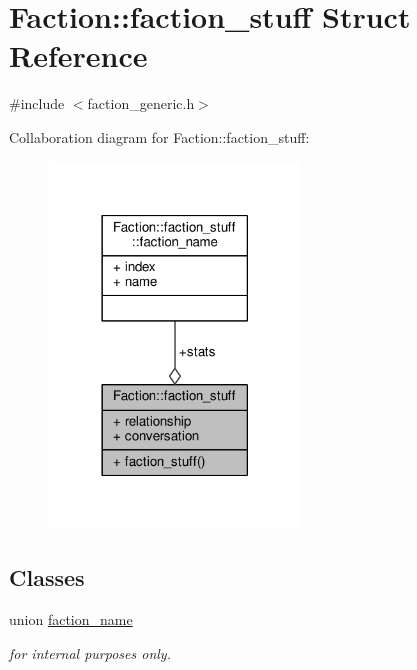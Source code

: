 \hypertarget{structFaction_1_1faction__stuff}{}\section{Faction\+:\+:faction\+\_\+stuff Struct Reference}
\label{structFaction_1_1faction__stuff}


{\ttfamily \#include $<$faction\+\_\+generic.\+h$>$}



Collaboration diagram for Faction\+:\+:faction\+\_\+stuff\+:
\nopagebreak
\begin{figure}[H]
\begin{center}
\leavevmode
\includegraphics[width=189pt]{dc/d6e/structFaction_1_1faction__stuff__coll__graph}
\end{center}
\end{figure}
\subsection*{Classes}
\begin{DoxyCompactItemize}
\item 
union \hyperlink{unionFaction_1_1faction__stuff_1_1faction__name}{faction\+\_\+name}
\begin{DoxyCompactList}\small\item\em for internal purposes only. \end{DoxyCompactList}\end{DoxyCompactItemize}
